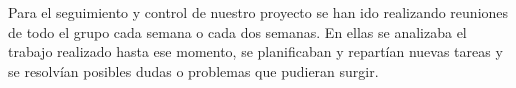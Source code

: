 Para el seguimiento y control de nuestro proyecto se han ido realizando reuniones de todo el grupo cada semana o cada dos semanas. En ellas se analizaba el trabajo realizado hasta ese momento, se planificaban y repartían nuevas tareas y se resolvían posibles dudas o problemas que pudieran surgir.